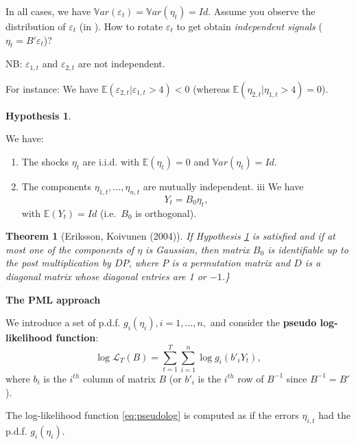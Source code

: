 \documentclass[
]{book}
\providecommand{\tightlist}{%
  \setlength{\itemsep}{0pt}\setlength{\parskip}{0pt}}
\newtheorem{theorem}{Theorem}[chapter]
\theoremstyle{definition}
\theoremstyle{definition}
\theoremstyle{definition}
\theoremstyle{definition}
\newtheorem{hypothesis}{Hypothesis}[chapter]
\theoremstyle{remark}
\begin{document}
In all cases, we have \(\mathbb{V}ar(\varepsilon_t)=\mathbb{V}ar(\eta_t)=Id\). Assume you observe the distribution of \(\varepsilon_t\) (in \color{red}{red}). How to rotate \(\varepsilon_t\) to get obtain \emph{independent signals} (\(\eta_t = B'\varepsilon_t\))?

NB: \(\varepsilon_{1,t}\) and \(\varepsilon_{2,t}\) are not independent.

For instance: We have \(\mathbb{E}(\varepsilon_{2,t}|\varepsilon_{1,t}>4)<0\) (whereas \(\mathbb{E}(\eta_{2,t}|\eta_{1,t}>4)=0\)).

\begin{hypothesis}
\protect\hypertarget{hyp:NonGauss}{}\label{hyp:NonGauss}

We have:

\begin{enumerate}
\def\labelenumi{\roman{enumi}.}
\tightlist
\item
  The shocks \(\eta_t\) are i.i.d. with \(\mathbb{E}(\eta_t) = 0\) and \(\mathbb{V}ar(\eta_t) = Id.\)
\item
  The components \(\eta_{1,t}, \ldots, \eta_{n,t}\) are mutually independent.
  iii We have
  \[
  \boxed{Y_t = B_0 \eta_t,}
  \]
  with \(\mathbb{E}(Y_t) = Id\) (i.e.~\(B_0\) is orthogonal).
\end{enumerate}

\end{hypothesis}

\begin{theorem}[Eriksson, Koivunen (2004)]
\protect\hypertarget{thm:EK2004}{}\label{thm:EK2004}If Hypothesis \ref{hyp:NonGauss} is satisfied and if at most one of the components of \(\eta\) is Gaussian, then matrix \(B_0\) is identifiable up to the post multiplication by \(DP\), where \(P\) is a permutation matrix and \(D\) is a diagonal matrix whose diagonal entries are 1 or \(-1\).\}
\end{theorem}

\textbf{The PML approach}

We introduce a set of p.d.f. \(g_i (\eta_i), i=1,\ldots,n,\) and consider the \textbf{pseudo log-likelihood function}:
\begin{equation}
\log \mathcal{L}_T (B) = \sum^T_{t=1} \sum^n_{i=1} \log g_i (b'_i Y_t),\label{eq:pseudolog}
\end{equation}
where \(b_i\) is the \(i^{th}\) column of matrix \(B\) (or \(b'_i\) is the \(i^{th}\) row of \(B^{-1}\) since \(B^{-1}=B'\)).

The log-likelihood function \eqref{eq:pseudolog} is computed as if the errors \(\eta_{i,t}\) had the p.d.f. \(g_i (\eta_i)\).
\end{document}
